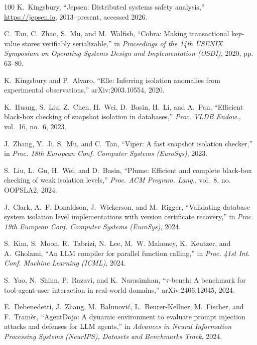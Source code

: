 \begin{thebibliography}{100}
K.~Kingsbury, ``Jepsen: Distributed systems safety analysis,''
  \url{https://jepsen.io}, 2013--present, accessed 2026.

C.~Tan, C.~Zhao, S.~Mu, and M.~Walfish, ``{Cobra}: Making transactional
  key-value stores verifiably serializable,'' in \emph{Proceedings of the 14th
  {USENIX} Symposium on Operating Systems Design and Implementation ({OSDI})},
  2020, pp. 63--80.

K.~Kingsbury and P.~Alvaro, ``{Elle}: Inferring isolation anomalies from
  experimental observations,'' arXiv:2003.10554, 2020.

K.~Huang, S.~Liu, Z.~Chen, H.~Wei, D.~Basin, H.~Li, and A.~Pan, ``Efficient
  black-box checking of snapshot isolation in databases,'' \emph{Proc. VLDB
  Endow.}, vol.~16, no.~6, 2023.

J.~Zhang, Y.~Ji, S.~Mu, and C.~Tan, ``Viper: A fast snapshot isolation
  checker,'' in \emph{Proc. 18th European Conf. Computer Systems (EuroSys)},
  2023.

S.~Liu, L.~Gu, H.~Wei, and D.~Basin, ``Plume: Efficient and complete black-box
  checking of weak isolation levels,'' \emph{Proc. ACM Program. Lang.}, vol.~8,
  no. OOPSLA2, 2024.

J.~Clark, A.~F. Donaldson, J.~Wickerson, and M.~Rigger, ``Validating database
  system isolation level implementations with version certificate recovery,''
  in \emph{Proc. 19th European Conf. Computer Systems (EuroSys)}, 2024.

S.~Kim, S.~Moon, R.~Tabrizi, N.~Lee, M.~W. Mahoney, K.~Keutzer, and
  A.~Gholami, ``An {LLM} compiler for parallel function calling,'' in
  \emph{Proc. 41st Int. Conf. Machine Learning (ICML)}, 2024.

S.~Yao, N.~Shinn, P.~Razavi, and K.~Narasimhan, ``$\tau$-bench: A benchmark for
  tool-agent-user interaction in real-world domains,'' arXiv:2406.12045, 2024.

E.~Debenedetti, J.~Zhang, M.~Balunovi\'c, L.~Beurer-Kellner, M.~Fischer, and
  F.~Tram\`er, ``{AgentDojo}: A dynamic environment to evaluate prompt
  injection attacks and defenses for {LLM} agents,'' in \emph{Advances in
  Neural Information Processing Systems (NeurIPS), Datasets and Benchmarks
  Track}, 2024.


\end{thebibliography}
